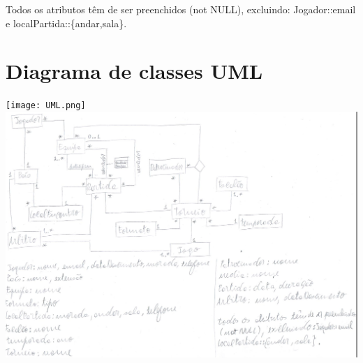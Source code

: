 \documentclass[a4paper]{article}
\begin{document}
Todos os atributos têm de ser preenchidos (not NULL), excluindo: Jogador::email e localPartida::\{andar,sala\}.


\section{Diagrama de classes UML}

\begin{center}
  \texttt{[image: UML.png]}
  \includegraphics[scale=0.83]{BDAD_DIAGRAMA.jpeg}
\end{center}

\clearpage
{}
\renewcommand\refname{Bibliografia}


\end{document}
